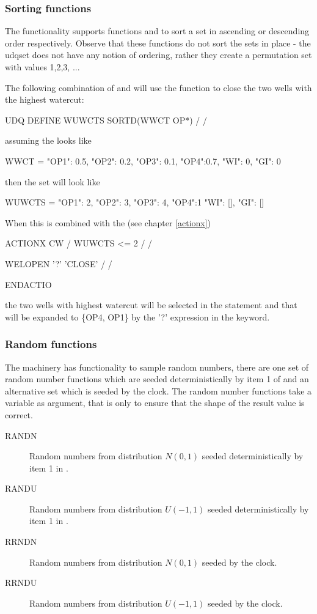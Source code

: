 \subsubsection*{Sorting functions}
The \udq{} functionality supports functions  and  to sort a
set in ascending or descending order respectively. Observe that these functions
do not sort the sets in place - the udqset does not have any notion of ordering,
rather they create a permutation set with values 1,2,3, ...

The following combination of \udq{} and  will use the 
function to close the two wells with the highest watercut:
\begin{deck}
UDQ
  DEFINE WUWCTS SORTD(WWCT OP*) /
/
\end{deck}
assuming the  looks like
\begin{code}
  WWCT = {"OP1": 0.5, "OP2": 0.2, "OP3": 0.1, "OP4":0.7, "WI": 0, "GI": 0}
\end{code}
then the  set will look like
\begin{code}
  WUWCTS = {"OP1": 2, "OP2": 3, "OP3": 4, "OP4":1 "WI": [], "GI": []}
\end{code}

When this is combined with the (see chapter \ref{actionx})
\begin{code}
ACTIONX
CW /
WUWCTS <= 2 /
/

WELOPEN
'?'  'CLOSE' /
/

ENDACTIO
\end{code}
the two wells with highest watercut will be selected in the  statement and that will be expanded to \{OP4, OP1\} by the '?'
expression in the  keyword.


\subsubsection*{Random functions}
The \udq{} machinery has functionality to sample random numbers, there are one
set of random number functions which are seeded deterministically by item 1 of
 and an alternative set which is seeded by the clock. The random
number functions take a \udq{} variable as argument, that is only to ensure that
the shape of the result value is correct.

\begin{description}
\item[RANDN] Random numbers from distribution $N(0,1)$ seeded deterministically
  by item 1 in .
\item[RANDU] Random numbers from distribution $U(-1,1)$ seeded deterministically
  by item 1 in .
\item[RRNDN] Random numbers from distribution $N(0,1)$ seeded by the clock.
\item[RRNDU] Random numbers from distribution $U(-1,1)$ seeded by the clock.
\end{description}

